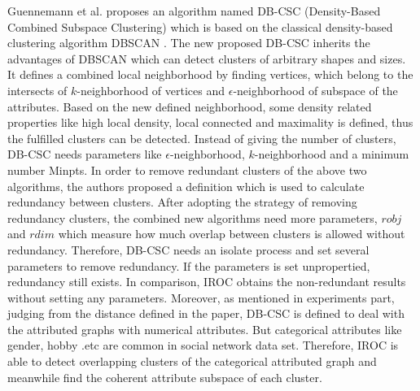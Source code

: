 Guennemann et al. proposes an algorithm named DB-CSC (Density-Based Combined Subspace Clustering) \cite{DBLP:conf/pkdd/GunnemannBS11} which is based on the classical density-based clustering algorithm DBSCAN \cite{DBLP:conf/kdd/EsterKSX96}. The new proposed DB-CSC inherits the advantages of DBSCAN which can detect clusters of arbitrary shapes and sizes. It defines a combined local neighborhood by finding vertices, which belong to the intersects of $k$-neighborhood of vertices and $\epsilon$-neighborhood of subspace of the attributes. Based on the new defined neighborhood, some density related properties like high local density, local connected and maximality is defined, thus the fulfilled clusters can be detected. Instead of giving the number of clusters, DB-CSC needs parameters like $\epsilon$-neighborhood, $k$-neighborhood and a minimum number Minpts. In order to remove redundant clusters of the above two algorithms, the authors proposed a definition which is used to calculate redundancy between clusters. After adopting the strategy of removing redundancy clusters, the combined new algorithms need more parameters, $robj$ and $rdim$ which measure how much overlap between clusters is allowed without redundancy. Therefore, DB-CSC needs an isolate process and set several parameters to remove redundancy. If the parameters is set unpropertied, redundancy still exists. In comparison, IROC obtains the non-redundant results without setting any parameters. Moreover, as mentioned in experiments part, judging from the distance defined in the paper, DB-CSC is defined to deal with the attributed graphs with numerical attributes. But categorical attributes like gender, hobby .etc are common in social network data set. Therefore, IROC is able to detect overlapping clusters of the categorical attributed graph and meanwhile find the coherent attribute subspace of each cluster.    


 
